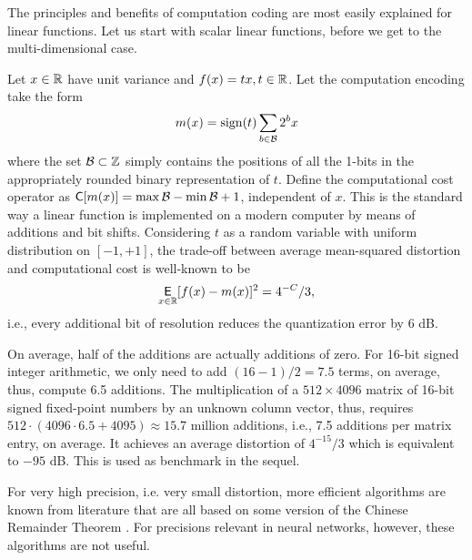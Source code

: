 \documentclass[twocolumn]{IEEEtran}
\def\expect{\mathop{\mbox{$\mathsf{E}$}}}
\begin{document}
The principles and benefits of computation coding are most easily explained for linear functions. Let us start with scalar linear functions, before we get to the multi-dimensional case.

\begin{example}
\label{ex1}
Let $x\in\mathbb{R}$ have unit variance and $f(x)=tx,t\in\mathbb{R}$. Let the computation encoding take the form
\begin{align} 
m(x)= {\rm sign}(t) \sum\limits_{b\in{\cal B}}2^b x
\end{align}
where the set ${\cal B}\subset \mathbb{Z}$ simply contains the positions of all the 1-bits in the appropriately rounded binary representation of $t$. Define the computational cost operator as ${\mathsf C}[m(x)]=\max {\cal B} -\min {\cal B} +1$, independent of $x$. This is the standard way a linear function is implemented on a modern computer by means of additions and bit shifts. Considering $t$ as a random variable with uniform distribution on $[-1,+1]$, the trade-off between average mean-squared distortion and computational cost is well-known to be \cite{gray:98}
\begin{align}
\expect\limits_{x\in\R} [f(x)-m(x)]^2=4^{-C}/3,
\label{ssia}
\end{align}
i.e., every additional bit of resolution reduces the quantization error by 6 dB. 
\end{example}

On average, half of the additions are actually additions of zero. For 16-bit signed integer arithmetic, we only need to add $(16-1)/2=7.5$ terms, on average, thus, compute 6.5 additions. The multiplication of a $512\times 4096$ matrix of 16-bit signed fixed-point numbers by an unknown column vector, thus, requires $512\cdot(4096\cdot 6.5+4095)\approx 15.7$ million additions, i.e., 7.5 additions per matrix entry, on average. It achieves an average distortion of $4^{-15}/3$ which is equivalent to $-95$ dB. This is used as benchmark in the sequel.

For very high precision, i.e. very small distortion, more efficient algorithms are known from literature that are all based on some version of the Chinese Remainder Theorem \cite{karatsuba:62,toom:63,cook:69,schoenhage:71,fuerer:09,harvey:16}. For precisions relevant in neural networks, however, these algorithms are not useful.
\end{document}
